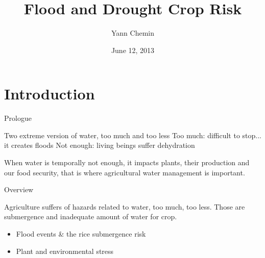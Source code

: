 \documentclass[xcolor=dvipsnames,beamer]{beamer} %
\title[Flood \& Drought Crop Risk]
{Flood and Drought Crop Risk}
\author[Yann Chemin]
{Yann Chemin}
\institute[IWMI]
{International Water Management Institute
\vspace{20pt}
}
\date{June 12, 2013}
\begin{document}
\frame{
\titlepage
}

\section{Introduction}
\begin{frame}[fragile]{Prologue}

\begin{block}{Two extreme version of water, too much and too less}
Too much: difficult to stop... it creates floods\newline
Not enough: living beings suffer dehydration\newline

When water is temporally not enough, it impacts plants, 
their production and our food security, 
that is where agricultural water management is important.\newline
\end{block}

\end{frame}

\begin{frame}[fragile]{Overview}

Agriculture suffers of hazards related to water, too much, too less.\newline
Those are submergence and inadequate amount of water for crop.

\begin{itemize}
 \item Flood events \& the rice submergence risk
 \item Plant and environmental stress
\end{itemize}

\end{frame}
\end{document}
